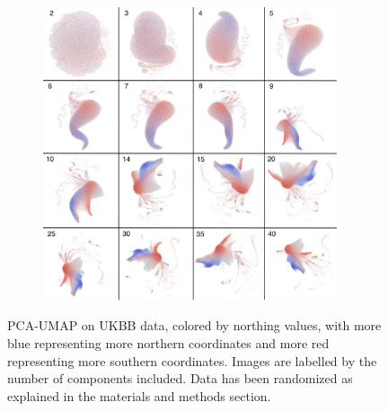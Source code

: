 \documentclass[12pt]{pnas-new}
\begin{document}
\begin{figure}
    \centering
    \begin{subfigure}{0.95\textwidth}
    \includegraphics[width=0.95\textwidth]{images/montage_ukbb_ns_pm.pdf}
    \end{subfigure}
    \caption{PCA-UMAP on UKBB data, colored by northing values, with more blue representing more northern coordinates and more red representing more southern coordinates. Images are labelled by the number of components included. Data has been randomized as explained in the materials and methods section.}
    \label{fig:supp_montage_ukbb_ns}
\end{figure}
\end{document}
